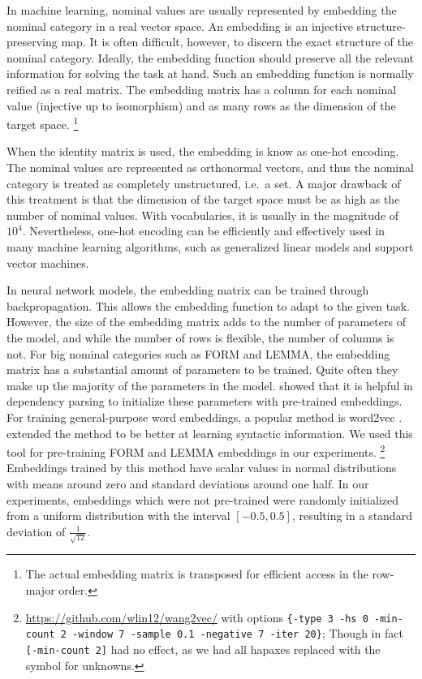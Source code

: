 \documentclass[11pt]{article}
\begin{document}
In machine learning, nominal values are usually represented by embedding the nominal category in a real vector space.
An embedding is an injective structure-preserving map.
It is often difficult, however, to discern the exact structure of the nominal category.
Ideally, the embedding function should preserve all the relevant information for solving the task at hand.
Such an embedding function is normally reified as a real matrix.
The embedding matrix has a column for each nominal value (injective up to isomorphism)
and as many rows as the dimension of the target space.%
\footnote{The actual embedding matrix is transposed for efficient access in the row-major order.}

When the identity matrix is used, the embedding is know as one-hot encoding.
The nominal values are represented as orthonormal vectors,
and thus the nominal category is treated as completely unstructured, i.e.\ a set.
A major drawback of this treatment is that the dimension of the target space must be as high as the number of nominal values.
With vocabularies, it is usually in the magnitude of \(10^{4}\).
Nevertheless, one-hot encoding can be efficiently and effectively used in many machine learning algorithms,
such as generalized linear models and support vector machines.

In neural network models, the embedding matrix can be trained through backpropagation.
This allows the embedding function to adapt to the given task.
However, the size of the embedding matrix adds to the number of parameters of the model,
and while the number of rows is flexible, the number of columns is not.
For big nominal categories such as FORM and LEMMA,
the embedding matrix has a substantial amount of parameters to be trained.
Quite often they make up the majority of the parameters in the model.
\textcite{chen2014fast} showed that it is helpful in dependency parsing to initialize these parameters with pre-trained embeddings.
For training general-purpose word embeddings, a popular method is word2vec \parencite{mikolov2013distributed, mikolov2013efficient}.
\textcite{ling2015naacl} extended the method to be better at learning syntactic information.
We used this tool for pre-training FORM and LEMMA embeddings in our experiments.%
\footnote{{\url{https://github.com/wlin12/wang2vec/}} with options
  \texttt{\{-type 3 -hs 0 -min-count 2 -window 7 -sample 0.1 -negative 7 -iter 20\}};
  Though in fact \texttt{[-min-count 2]} had no effect,
  as we had all hapaxes replaced with the symbol for unknowns.}
Embeddings trained by this method have scalar values in normal distributions with means around zero
and standard deviations around one half.
In our experiments, embeddings which were not pre-trained were randomly initialized
from a uniform distribution with the interval \(\left[ -0.5, 0.5 \right]\),
resulting in a standard deviation of \(\frac{1}{\sqrt{12}}\).
\end{document}
